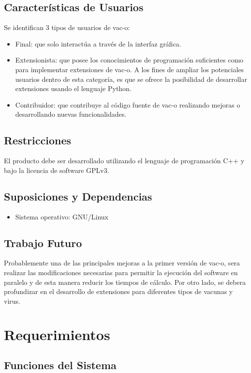 \documentclass[10pt,a4paper]{article}
\begin{document}
  \subsection{Caracter\'isticas de Usuarios}
  Se identifican 3 tipos de usuarios de vac-o:
  \begin{itemize}
    \item Final: que solo interact\'ua a trav\'es de la interfaz gr\'afica.
    \item Extensionista: que posee los conocimientos de programaci\'on suficientes como para implementar extensiones de vac-o. A los fines de ampliar los potenciales usuarios dentro de esta categor\'ia, es que se ofrece la posibilidad de desarrollar extensiones usando el lenguaje Python.
    \item Contribuidor: que contribuye al c\'odigo fuente de vac-o realizando mejoras o desarrollando nuevas funcionalidades.
  \end{itemize}

  \subsection{Restricciones}
  El producto debe ser desarrollado utilizando el lenguaje de programaci\'on C++ y bajo la licencia de software GPLv3.
  
  \subsection{Suposiciones y Dependencias}
    \begin{itemize}
      \item Sistema operativo: GNU/Linux
    \end{itemize}
  
  \subsection{Trabajo Futuro}
  Probablemente una de las principales mejoras a la primer versi\'on de vac-o, sera realizar las modificaciones necesarias para permitir la ejecuci\'on del software en paralelo y de esta manera reducir los tiempos de c\'alculo. 
  Por otro lado, se debera profundizar en el desarrollo de extensiones para diferentes tipos de vacunas y virus.
  

\section{Requerimientos}
  \label{section-req}  
  \subsection{Funciones del Sistema}
\end{document}
